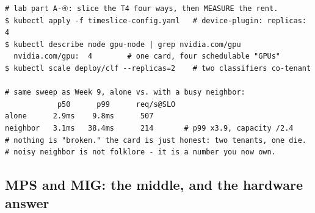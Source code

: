 \begin{terminalbox}
\begin{Verbatim}[breaklines=true,breakanywhere=true,fontsize=\small,formatcom=\color{tbbtermfg},codes=\tbbcodeactive]
# lab part A-④: slice the T4 four ways, then MEASURE the rent.
$ kubectl apply -f timeslice-config.yaml   # device-plugin: replicas: 4
$ kubectl describe node gpu-node | grep nvidia.com/gpu
  nvidia.com/gpu:  4        # one card, four schedulable "GPUs"
$ kubectl scale deploy/clf --replicas=2    # two classifiers co-tenant

# same sweep as Week 9, alone vs. with a busy neighbor:
            p50      p99      req/s@SLO
alone      2.9ms    9.8ms      507
neighbor   3.1ms   38.4ms      214       # p99 x3.9, capacity /2.4
# nothing is "broken." the card is just honest: two tenants, one die.
# noisy neighbor is not folklore - it is a number you now own.
\end{Verbatim}
\end{terminalbox}

\subsection*{MPS and MIG: the middle, and the hardware answer}


